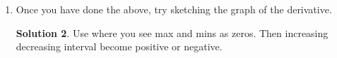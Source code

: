\documentclass[10pt]{article}
\theoremstyle{Theorem}
\theoremstyle{definition}
\newtheorem*{solution}{Solution}
\theoremstyle{remark}
\theoremstyle{custom}
\begin{document}
\begin{enumerate}[1.]
\begin{solution}
\end{solution}
\item Once you have done the above, try sketching the graph of the derivative.
\begin{solution}
Use where you see max and mins as zeros. Then increasing decreasing interval become positive or negative.
\end{solution}
\end{enumerate}
\end{document}
